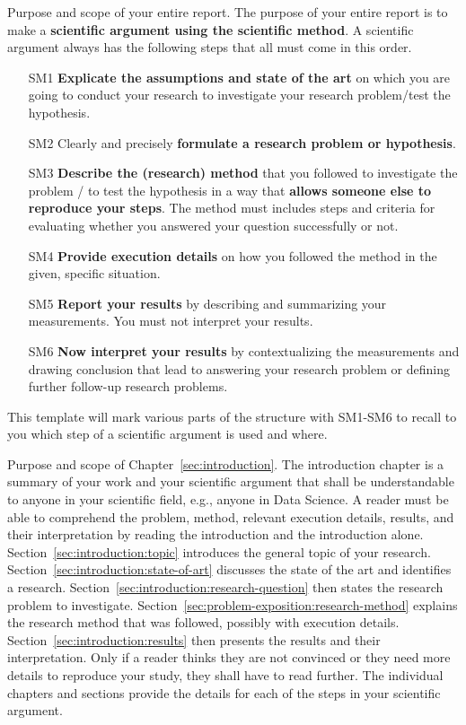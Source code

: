 \documentclass[12pt,a4paper,footinclude=true,twoside,headinclude=true]{report}
\begin{document}
\textsf{Purpose and scope of your entire report}. The purpose of your entire report is to make a \textbf{scientific argument using the scientific method}. A scientific argument always has the following steps that all must come in this order.
%
\begin{itemize}
    \item[SM1] \textbf{Explicate the assumptions and state of the art} on which you are going to conduct your research to investigate your research problem/test the hypothesis.
    \item[SM2] Clearly and precisely  \textbf{formulate a research problem or hypothesis}.
    \item[SM3] \textbf{Describe the (research) method} that you followed to investigate the problem / to test the hypothesis in a way that \textbf{allows someone else to reproduce your steps}. The method must includes steps and criteria for evaluating whether you answered your question successfully or not.
    \item[SM4] \textbf{Provide execution details} on how you followed the method in the given, specific situation.
    \item[SM5] \textbf{Report your results} by describing and summarizing your measurements. You must not interpret your results.
    \item[SM6] \textbf{Now interpret your results} by contextualizing the measurements and drawing conclusion that lead to answering your research problem or defining further follow-up research problems.
\end{itemize}
%
This template will mark various parts of the structure with SM1-SM6 to recall to you which step of a scientific argument is used and where.

\textsf{Purpose and scope of Chapter~\ref{sec:introduction}}. The introduction chapter is a summary of your work and your scientific argument that shall be understandable to anyone in your scientific field, e.g., anyone in Data Science. A reader must be able to comprehend the problem, method, relevant execution details, results, and their interpretation by reading the introduction and the introduction alone. Section~\ref{sec:introduction:topic} introduces the general topic of your research. Section~\ref{sec:introduction:state-of-art} discusses the state of the art and identifies a research. Section~\ref{sec:introduction:research-question} then states the research problem to investigate. Section~\ref{sec:problem-exposition:research-method} explains the research method that was followed, possibly with execution details. Section~\ref{sec:introduction:results} then presents the results and their interpretation. Only if a reader thinks they are not convinced or they need more details to reproduce your study, they shall have to read further. The individual chapters and sections provide the details for each of the steps in your scientific argument. 
\end{document}
